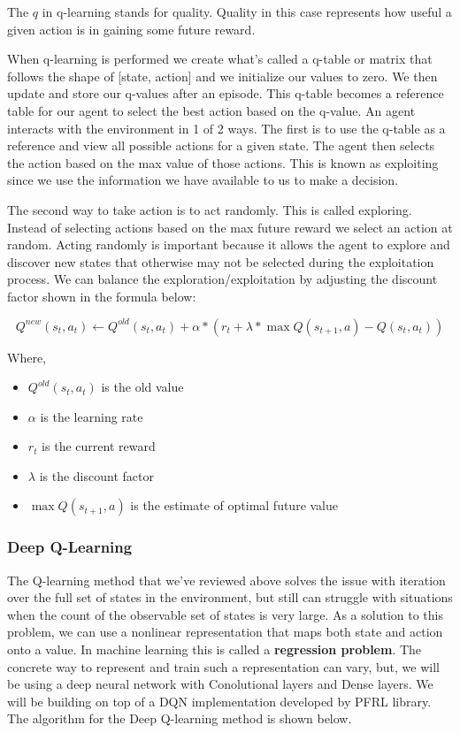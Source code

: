 \documentclass[conference]{IEEEtran}
\begin{document}
The $q$ in q-learning stands for quality. Quality in this case represents how useful a given action is in gaining some future reward.

When q-learning is performed we create what's called a q-table or matrix that follows the shape of [state, action] and we initialize our values to zero. We then update and store our q-values after an episode. This q-table becomes a reference table for our agent to select the best action based on the q-value. An agent interacts with the environment in 1 of 2 ways. The first is to use the q-table as a reference and view all possible actions for a given state. 
The agent then selects the action based on the max value of those actions. This is known as exploiting since we use the information we have available to us to make a decision.

The second way to take action is to act randomly. This is called exploring. Instead of selecting actions based on the max future reward we select an action at random. Acting randomly is important because it allows the agent to explore and discover new states that otherwise may not be selected during the exploitation process. We can balance the exploration/exploitation by adjusting the discount factor shown in the formula below:

\begin{equation}
    {Q}^{new}(s_{t}, a_{t}) \leftarrow {Q}^{old}(s_{t}, a_{t}) + \alpha * (r_{t} + \lambda*\max Q(s_{t+1}, a) - Q(s_{t}, a_{t}))
\end{equation}

Where, 
\begin{itemize}
    \item ${Q}^{old}(s_{t}, a_{t})$ is the old value
    \item $\alpha$ is the learning rate
    \item $r_{t}$ is the current reward
    \item $\lambda$ is the discount factor
    \item $\max Q(s_{t+1}, a)$ is the estimate of optimal future value
\end{itemize}

\subsubsection{Deep Q-Learning}
The Q-learning method that we've reviewed above solves the issue with iteration over the full set of states in the environment, but still can struggle with situations when the count of the observable set of states is very large. As a solution to this problem, we can use a nonlinear representation that maps both state and action onto a value. In machine learning this is called a \textbf{regression problem}. The concrete way to represent and train such a representation can vary, 
but, we will be using a deep neural network with Conolutional layers and Dense layers. We will be building on top of a DQN implementation developed by PFRL library\cite{JMLR:v22:20-376}.
The algorithm for the Deep Q-learning method is shown below.
\end{document}
